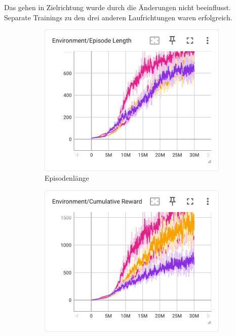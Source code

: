 Das gehen in Zielrichtung wurde durch die Änderungen nicht beeinflusst. Separate Trainings zu den drei anderen Laufrichtungen waren erfolgreich.

\begin{figure}[H]
  \centering  
  \begin{subfigure}{.49\textwidth}
      \centering  
      \includegraphics[width=\textwidth]{img/116_130_131_132_episode_length}
      \caption{Episodenlänge}
      \label{fig:116_130_131_132_episode_length}
    \end{subfigure}
    \begin{subfigure}{.49\textwidth}
      \centering  
      \includegraphics[width=\textwidth]{img/116_130_131_132_cumulative_reward}

\end{subfigure}
\end{figure}
